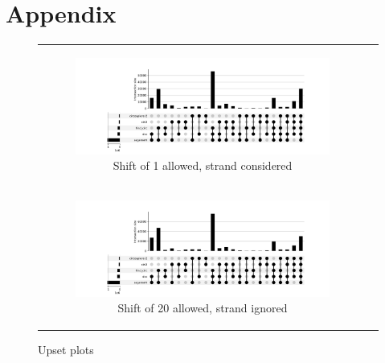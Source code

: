 \chapter{Appendix}

\begin{figure}[ht]
    \begin{tabular}{cc}
        \begin{subfigure}{\textwidth}
            \centering

            \includegraphics[width=\linewidth]{chapters/4_results_and_discussion/figures/detection/upset/shift_5.png}
            \caption{Shift of 1 allowed, strand considered}
            \label{fig:detection_upset_1_strand}
        \end{subfigure}
        \\
        \begin{subfigure}{\textwidth}
            \centering

            \includegraphics[width=\linewidth]{chapters/4_results_and_discussion/figures/detection/upset/shift_20.png}
            \caption{Shift of 20 allowed, strand ignored}
            \label{fig:detection_upset_20_nostrand}
        \end{subfigure}
    \end{tabular}
    \caption{Upset plots
    }
    \label{fig:appendix_detection_upset}
\end{figure}
